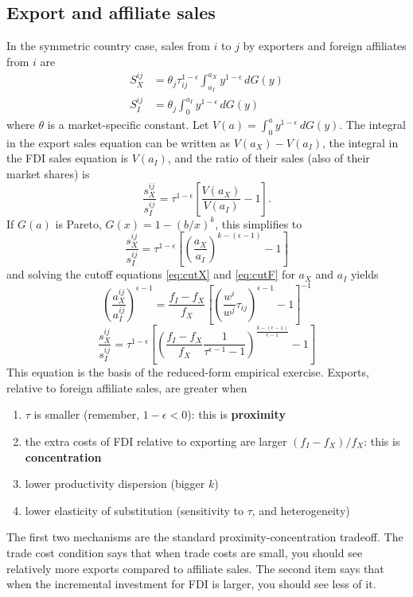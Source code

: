 \documentclass[11pt, pdftex]{article}
\begin{document}
\subsection*{Export and affiliate sales}
In the symmetric country case, sales from $i$ to $j$ by exporters and foreign affiliates from $i$ are
\begin{align}
    S_X^{ij}&=\theta_j \tau_{ij}^{1-\epsilon}\int_{a_I}^{a_X}y^{1-\epsilon}\,dG(y)\\
    S_I^{ij}&=\theta_j \int_{0}^{a_I}y^{1-\epsilon}\,dG(y)
\end{align}
where $\theta$ is a market-specific constant. Let $V(a) = \int_0^a y^{1-\epsilon}\,dG(y)$. The integral in the export sales equation can be written as $V(a_X)-V(a_I)$, the integral in the FDI sales equation is $V(a_I)$, and the ratio of their sales (also of their market shares) is
\begin{equation}\label{eq:relshares}
    \frac{s_X^{ij}}{s_I^{ij}}=\tau^{1-\epsilon} \left[ \frac{V(a_X)}{V(a_I)}-1 \right].
\end{equation}
If $G(a)$ is Pareto, $G(x)=1-(b/x)^k$, this simplifies to
\begin{equation}\label{eq:relshares2}
    \frac{s_X^{ij}}{s_I^{ij}}=\tau^{1-\epsilon} \left[ \left(\frac{a_X}{a_I}\right)^{k-(\epsilon-1)}-1 \right]
\end{equation}
and solving the cutoff equations \eqref{eq:cutX} and \eqref{eq:cutF} for $a_X$ and $a_I$ yields
\begin{equation}
  \left(\frac{a_X^{ij}}{a_I^{ij}}\right)^{\epsilon-1} = \frac{f_I-f_X}{f_X} \left[\left(\frac{w^i}{w^j}\tau_{ij}\right)^{\epsilon-1}-1\right]^{-1}
\end{equation}
\begin{equation}\label{eq:relshares3}
    \frac{s_X^{ij}}{s_I^{ij}}=\tau^{1-\epsilon} \left[ \left(\frac{f_I-f_X}{f_X} \frac{1}{\tau^{\epsilon-1}-1}\right)^{\frac{k-(\epsilon-1)}{\epsilon-1}}-1 \right]
\end{equation}
This equation is the basis of the reduced-form empirical exercise. Exports, relative to foreign affiliate sales, are greater when
\begin{enumerate}
  \item $\tau$ is smaller (remember, $1-\epsilon<0$): this is \textbf{proximity}
  \item the extra costs of FDI relative to exporting are larger $(f_I-f_X)/f_X$: this is \textbf{concentration}
  \item lower productivity dispersion (bigger $k$)
  \item lower elasticity of substitution (sensitivity to $\tau$, and heterogeneity)

\end{enumerate}
The first two mechanisms are the standard proximity-concentration tradeoff.  The trade cost condition says that when trade costs are small, you should see relatively more exports compared to affiliate sales.  The second item says that when the incremental investment for FDI is larger, you should see less of it.
\end{document}
